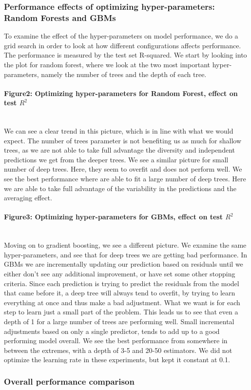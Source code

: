 \documentclass[10pt, a4paper, twocolumn]{article}
\newcommand{\myparagraph}[1]{\paragraph{#1}\mbox{}\\}
\begin{document}
		\subsubsection{Performance effects of optimizing hyper-parameters: Random Forests and GBMs}
			To examine the effect of the hyper-parameters on model performance, we do a grid search in order to look at how different configurations affects performance. The performance is measured by the test set R-squared. We start by looking into the plot for random forest, where we look at the two most important hyper-parameters, namely the number of trees and the depth of each tree.
			\myparagraph{Figure2: Optimizing hyper-parameters for Random Forest, effect on test $R^2$}
			We can see a clear trend in this picture, which is in line with what we would expect. The number of trees parameter is not benefiting us as much for shallow trees, as we are not able to take full advantage the diversity and independent predictions we get from the deeper trees. We see a similar picture for small number of deep trees. Here, they seem to overfit and does not perform well. We see the best performance where are able to fit a large number of deep trees. Here we are able to take full advantage of the variability in the predictions and the averaging effect.
			\myparagraph{Figure3: Optimizing hyper-parameters for GBMs, effect on test $R^2$}
			Moving on to gradient boosting, we see a different picture. We examine the same hyper-parameters, and see that for deep trees we are getting bad performance. In GBMs we are incrementally updating our prediction based on residuals until we either don't see any additional improvement, or have set some other stopping criteria. Since each prediction is trying to predict the residuals from the model that came before it, a deep tree will always tend to overfit, by trying to learn everything at once and thus make a bad adjustment. What we want is for each step to learn just a small part of the problem. This leads us to see that even a depth of 1 for a large number of trees are performing well. Small incremental adjustments based on only a single predictor, tends to add up to a good performing model overall. We see the best performance from somewhere in between the extremes, with a depth of 3-5 and 20-50 estimators. We did not optimize the learning rate in these experiments, but kept it constant at 0.1.
			
		\subsubsection{Overall performance comparison}
			
\end{document}
